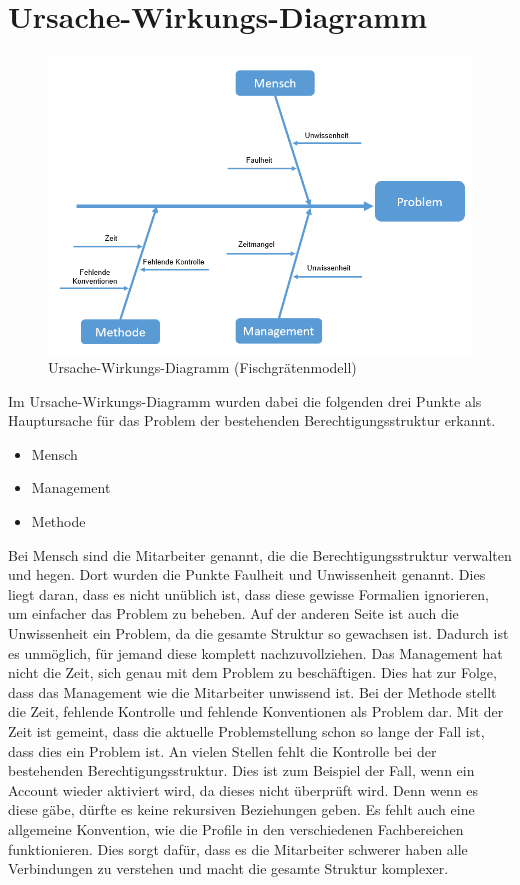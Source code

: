 \section{Ursache-Wirkungs-Diagramm}
\label{sec:intro:UWD}
\begin{figure}[h!]
 \centering
 \includegraphics[width=1\textwidth]{gfx/Picture/Fisch.PNG}
 \caption{Ursache-Wirkungs-Diagramm (Fischgrätenmodell)}
 \label{fig:Fisch}
\end{figure}
Im Ursache-Wirkungs-Diagramm wurden dabei die folgenden drei Punkte als Hauptursache für das Problem der bestehenden Berechtigungsstruktur erkannt.
\begin{itemize}
	\item Mensch
	\item Management
	\item Methode
\end{itemize}
Bei Mensch sind die Mitarbeiter genannt, die die Berechtigungsstruktur verwalten und hegen.
Dort wurden die Punkte Faulheit und Unwissenheit genannt.
Dies liegt daran, dass es nicht unüblich ist, dass diese gewisse Formalien ignorieren, um einfacher das Problem zu beheben.
Auf der anderen Seite ist auch die Unwissenheit ein Problem, da die gesamte Struktur so gewachsen ist.
Dadurch ist es unmöglich, für jemand diese komplett nachzuvollziehen.
\newline
Das Management hat nicht die Zeit, sich genau mit dem Problem zu beschäftigen.
Dies hat zur Folge, dass das Management wie die Mitarbeiter unwissend ist.
\newline
Bei der Methode stellt die Zeit, fehlende Kontrolle und fehlende Konventionen als Problem dar.
Mit der Zeit ist gemeint, dass die aktuelle Problemstellung schon so lange der Fall ist, dass dies ein Problem ist.
An vielen Stellen fehlt die Kontrolle bei der bestehenden Berechtigungsstruktur.
Dies ist zum Beispiel der Fall, wenn ein Account wieder aktiviert wird, da dieses nicht überprüft wird.
Denn wenn es diese gäbe, dürfte es keine rekursiven Beziehungen geben.
Es fehlt auch eine allgemeine Konvention, wie die Profile in den verschiedenen Fachbereichen funktionieren.
Dies sorgt dafür, dass es die Mitarbeiter schwerer haben alle Verbindungen zu verstehen und macht die gesamte Struktur komplexer.